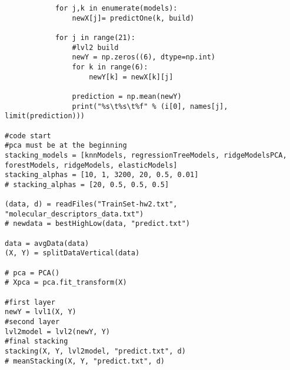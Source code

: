 \documentclass[a4paper,11pt]{article}
\begin{document}
\begin{lstlisting}
            for j,k in enumerate(models):
                newX[j]= predictOne(k, build)

            for j in range(21):
                #lvl2 build
                newY = np.zeros((6), dtype=np.int)
                for k in range(6):
                    newY[k] = newX[k][j]

                prediction = np.mean(newY)
                print("%s\t%s\t%f" % (i[0], names[j], limit(prediction)))

#code start
#pca must be at the beginning
stacking_models = [knnModels, regressionTreeModels, ridgeModelsPCA, forestModels, ridgeModels, elasticModels]
stacking_alphas = [10, 1, 3200, 20, 0.5, 0.01]
# stacking_alphas = [20, 0.5, 0.5, 0.5]

(data, d) = readFiles("TrainSet-hw2.txt", "molecular_descriptors_data.txt")
# newdata = bestHighLow(data, "predict.txt")

data = avgData(data)
(X, Y) = splitDataVertical(data)

# pca = PCA()
# Xpca = pca.fit_transform(X)

#first layer
newY = lvl1(X, Y)
#second layer
lvl2model = lvl2(newY, Y)
#final stacking
stacking(X, Y, lvl2model, "predict.txt", d)
# meanStacking(X, Y, "predict.txt", d)

\end{lstlisting}
\end{document}

